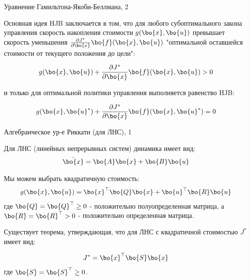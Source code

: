\documentclass{beamer}
\begin{document}
\begin{frame}{Уравнение Гамильтона-Якоби-Беллмана, 2}
	\begin{flushleft}
		
		Основная идея HJB заключается в том, что для любого субоптимального закона управления скорость накопления стоимости $g(\bo{x}, \bo{u})$ превышает скорость уменьшения $\frac{\partial J^*}{\partial \bo{x}} \bo{f} (\bo{x}, \bo{u})$ "оптимальной оставшейся стоимости от текущего положения до цели": 
		
		\begin{equation}
			g(\bo{x}, \bo{u}) + 
			\frac{\partial J^*}{\partial \bo{x}} \bo{f} (\bo{x}, \bo{u}) > 0
		\end{equation}
		
		и только для оптимальной политики управления выполняется равенство HJB:
		
		\begin{equation}
			g(\bo{x}, \bo{u}^*) + 
			\frac{\partial J^*}{\partial \bo{x}} \bo{f} (\bo{x}, \bo{u}^*) 
			= 0
		\end{equation}
		
	\end{flushleft}
\end{frame}




\begin{frame}{Алгебраическое ур-е Риккати (для ЛНС), 1}
	\begin{flushleft}
		
		Для ЛНС (линейных непрерывных систем) динамика имеет вид:
		\begin{equation}
			\dot {\bo{x}} = \bo{A}  \bo{x} + \bo{B} \bo{u}
		\end{equation}
		
		Мы можем выбрать квадратичную стоимость:
		\begin{equation}
			g(\bo{x}, \bo{u} ) = 
			\bo{x}^\top \bo{Q} \bo{x} +
			\bo{u} ^\top \bo{R} \bo{u} 
		\end{equation}
		где $\bo{Q} = \bo{Q}^\top \geq 0$ - положительно полуопределенная матрица, а $\bo{R} = \bo{R}^\top > 0$ - положительно определенная матрица.
		
		\bigskip
		
		Существует теорема, утверждающая, что для ЛНС с квадратичной стоимостью $J^*$ имеет вид:
		
		\begin{equation}
			J^* = \bo{x}^\top \bo{S} \bo{x}
		\end{equation}
		где $\bo{S} = \bo{S}^\top \geq 0$.
		
		
	\end{flushleft}
\end{frame}
\end{document}
